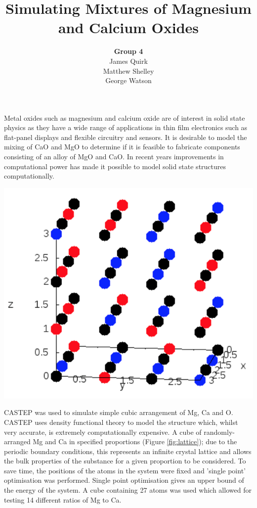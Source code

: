 \documentclass[a4paper,12pt]{article}
\title{Simulating Mixtures of Magnesium and Calcium Oxides}
\author{\textbf{Group 4}\\
	James Quirk\\
	Matthew Shelley\\
	George Watson}
\date{}
\begin{document}
\maketitle

\begin{abstract}
    
\end{abstract}

\begin{multicols}{2}
	
	Metal oxides such as magnesium and calcium oxide are of interest in solid state physics as they have a wide range of applications in thin film electronics such as flat-panel displays and flexible circuitry and sensors.\cite{kim2011lowtemperature} It is desirable to model the mixing of CaO and MgO to determine if it is feasible to fabricate components consisting of an alloy of MgO and CaO. In recent years improvements in computational power has made it possible to model solid state structures computationally.
	\begin{center}
	    \includegraphics[keepaspectratio=true,scale=0.40]{lattice}
			\label{fig:lattice} 
	\end{center} 
	
	CASTEP\cite{clark2009first} was used to simulate simple cubic arrangement of Mg, Ca and O. CASTEP uses density functional theory to model the structure which, whilst very accurate, is extremely computationally expensive.  A cube of randomly-arranged Mg and Ca in specified proportions (Figure \ref{fig:lattice}); due to the periodic boundary conditions, this represents an infinite crystal lattice and allows the bulk properties of the substance for a given proportion to be considered. To save time, the positions of the atoms in the system were fixed and 'single point' optimisation was performed. Single point optimisation gives an upper bound of the energy of the system.  A cube containing 27 atoms was used which allowed for testing 14 different ratios of Mg to Ca. 
	

\end{multicols}
\end{document}
